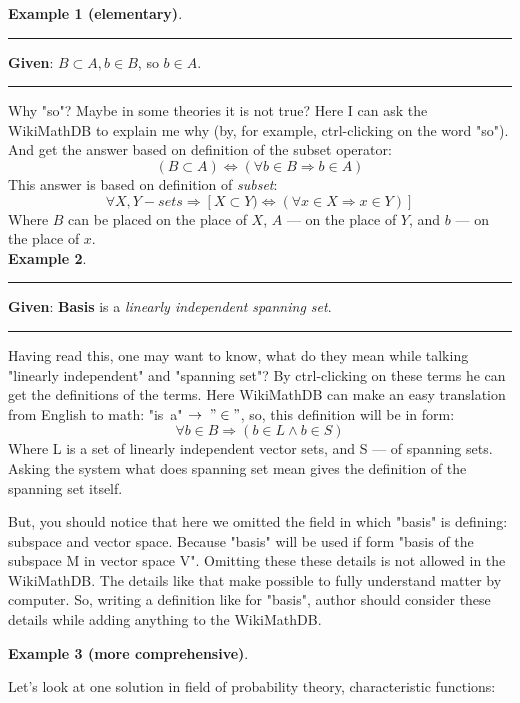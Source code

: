 \documentclass{article}
\begin{document}
{\bf Example 1 (elementary)}.\\

\hrule\bigskip

{\bf Given}: $B \subset A, b \in B$, so $b \in A$.\\

\hrule\bigskip

Why "so"? Maybe in some theories it is not true? Here I can ask the
WikiMathDB to explain me why (by, for example, ctrl-clicking on the
word "so"). And get the answer based on definition of the subset
operator:
$$(B \subset A) \Leftrightarrow (\forall b \in B \Rightarrow b \in
A)$$ This answer is based on definition of \textit{subset}:
$$\forall X,Y - sets \Rightarrow [X \subset Y) \Leftrightarrow
(\forall x \in X \Rightarrow x \in Y)]$$ Where $B$ can be placed on
the place of $X$, $A$ --- on the place of $Y$, and $b$ --- on the
place of $x$.
\\

{\bf Example 2}.\\

\hrule\bigskip

{\bf Given}: \textbf{Basis} is a \textit{linearly
independent} \textit{spanning set}.\\

\hrule\bigskip

Having read this, one may want to know, what do they mean while
talking "linearly independent" and "spanning set"? By ctrl-clicking
on these terms he can get the definitions of the terms. Here
WikiMathDB can make an easy translation from English to math: "is\
a"$\ \rightarrow\; "\in"$, so, this definition will be in form:
$$
\forall b \in B \Rightarrow (b \in L \wedge b \in S)
$$
Where L is a set of linearly independent vector sets, and S --- of
spanning sets. Asking the system what does spanning set mean gives
the definition of the spanning set itself.

But, you should notice that here we omitted the field in which
"basis" is defining: subspace and vector space. Because "basis" will
be used if form "basis of the subspace M in vector space V".
Omitting these these details is not allowed in the WikiMathDB. The
details like that make possible to fully understand matter by
computer. So, writing a definition like for "basis", author should
consider these details while adding anything to the WikiMathDB.
\\
\newpage

{\bf Example 3 (more comprehensive)}.

Let's look at one solution in field of probability theory,
characteristic functions:\\
\end{document}
